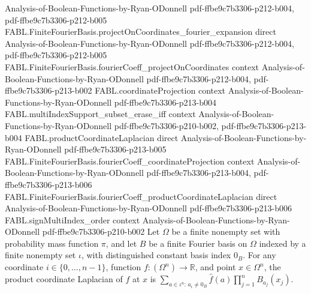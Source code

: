 \begin{theorem}
  {Analysis-of-Boolean-Functions-by-Ryan-ODonnell}
  {pdf-ffbe9c7b3306-p212-b004,
    pdf-ffbe9c7b3306-p212-b005}
\proofstep
  {FABL.FiniteFourierBasis.projectOnCoordinates_fourier_expansion}
  {direct}
  {Analysis-of-Boolean-Functions-by-Ryan-ODonnell}
  {pdf-ffbe9c7b3306-p212-b004,
    pdf-ffbe9c7b3306-p212-b005}
\proofstep
  {FABL.FiniteFourierBasis.fourierCoeff_projectOnCoordinates}
  {context}
  {Analysis-of-Boolean-Functions-by-Ryan-ODonnell}
  {pdf-ffbe9c7b3306-p212-b004,
    pdf-ffbe9c7b3306-p213-b002}
\proofstep
  {FABL.coordinateProjection}
  {context}
  {Analysis-of-Boolean-Functions-by-Ryan-ODonnell}
  {pdf-ffbe9c7b3306-p213-b004}
\proofstep
  {FABL.multiIndexSupport_subset_erase_iff}
  {context}
  {Analysis-of-Boolean-Functions-by-Ryan-ODonnell}
  {pdf-ffbe9c7b3306-p210-b002,
    pdf-ffbe9c7b3306-p213-b004}
\proofstep
  {FABL.productCoordinateLaplacian}
  {direct}
  {Analysis-of-Boolean-Functions-by-Ryan-ODonnell}
  {pdf-ffbe9c7b3306-p213-b005}
\proofstep
  {FABL.FiniteFourierBasis.fourierCoeff_coordinateProjection}
  {context}
  {Analysis-of-Boolean-Functions-by-Ryan-ODonnell}
  {pdf-ffbe9c7b3306-p213-b004,
    pdf-ffbe9c7b3306-p213-b006}
\proofstep
  {FABL.FiniteFourierBasis.fourierCoeff_productCoordinateLaplacian}
  {direct}
  {Analysis-of-Boolean-Functions-by-Ryan-ODonnell}
  {pdf-ffbe9c7b3306-p213-b006}
\proofstep
  {FABL.signMultiIndex_order}
  {context}
  {Analysis-of-Boolean-Functions-by-Ryan-ODonnell}
  {pdf-ffbe9c7b3306-p210-b002}
Let $\Omega$ be a finite nonempty set with probability mass function $\pi$, and let $B$
be a finite Fourier basis on $\Omega$ indexed by a finite nonempty set $\iota$, with
distinguished constant basis index $0_B$. For any coordinate $i\in\{0,\ldots,n-1\}$,
function $f:(\Omega^n)\to\mathbb R$, and point $x\in\Omega^n$, the product coordinate
Laplacian of $f$ at $x$ is $\sum_{a\in\iota^n:\,a_i\ne 0_B}\widehat f(a)\prod_{j=1}^n
B_{a_j}(x_j)$.
\end{theorem}

